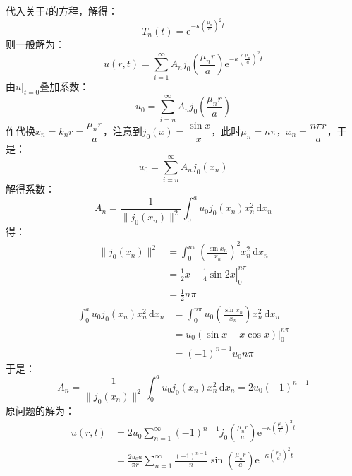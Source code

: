 \documentclass[fontset=windows]{ctexart}
\begin{document}
\begin{itemize}
    代入关于$t$的方程，解得：
    \[
    T_n(t) = \mathrm{e}^{-\kappa\left(\tfrac{\mu_n}{a}\right)^2 t}
    \]
    则一般解为：
    \[
    u(r,t) = \sum_{i=1}^{\infty} A_n j_0\left(\frac{\mu_n r}{a}\right)\mathrm{e}^{-\kappa\left(\tfrac{\mu_n}{a}\right)^2 t}
    \]
    由$\left.u\right|_{t=0}$叠加系数：
    \[
    u_0 = \sum_{i=n}^{\infty} A_n j_0\left(\frac{\mu_n r}{a}\right)
    \]
    作代换$x_n = k_n r = \dfrac{\mu_n r}{a}$，注意到$j_0(x) = \dfrac{\sin x}{x}$，此时$\mu_n = n\pi$，$x_n = \dfrac{n\pi r}{a}$，于是：
    \[
    u_0 = \sum_{i=n}^{\infty} A_n j_0(x_n)
    \]
    解得系数：
    \[
    A_n = \frac{1}{\|j_0(x_n)\|^2} \int_0^a u_0 j_0(x_n)x_n^2 \,\mathrm{d}x_n
    \]
    得：
    \begin{align*}
    \|j_0(x_n)\|^2
    &= \int_0^{n\pi}\left(\frac{\sin x_n}{x_n}\right)^2 x_n^2 \,\mathrm{d}x_n \\
    &= \left.\frac{1}{2}x - \frac{1}{4}\sin{2x}\right|_0^{n\pi} \\
    &= \frac{1}{2}n\pi
    \end{align*}
    \begin{align*}
    \int_0^a u_0 j_0(x_n)x_n^2 \,\mathrm{d}x_n
    &= \int_0^{n\pi} u_0\left(\frac{\sin x_n}{x_n}\right) x_n^2 \,\mathrm{d}x_n \\
    &= u_0(\sin x - x\cos x)\big|_0^{n\pi} \\
    &= (-1)^{n-1}u_0 n\pi
    \end{align*}
    于是：
    \[
    A_n = \frac{1}{\|j_0(x_n)\|^2} \int_0^a u_0 j_0(x_n)x_n^2 \,\mathrm{d}x_n = 2u_0 (-1)^{n-1}
    \]
    原问题的解为：
    \begin{align*}
    u(r,t)
    &= 2u_0 \sum_{n=1}^{\infty} (-1)^{n-1}j_0\left(\frac{\mu_n r}{a}\right)\mathrm{e}^{-\kappa\left(\tfrac{\mu_n}{a}\right)^2 t} \\
    &= \frac{2u_0 a}{\pi r}\sum_{n=1}^{\infty} \frac{(-1)^{n-1}}{n}\sin\left(\frac{\mu_n r}{a}\right)\mathrm{e}^{-\kappa\left(\tfrac{\mu_n}{a}\right)^2 t}
    \end{align*}

    \end{itemize}
\end{document}
